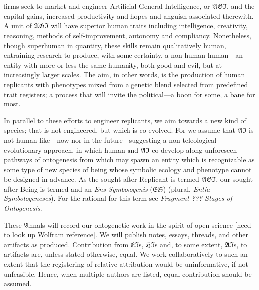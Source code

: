 


\section*{}

\lettrine[lines=3]{\junicode{\textcolor{violet}{AI}}}{} firms seek to market
and engineer Artificial General Intelligence, or $\mathfrak{AGI}$, and the
capital gains, increased productivity and hopes and anguish associated
therewith.  A unit of $\mathfrak{AGI}$ will have superior human traits
including intelligence, creativity, reasoning, methods of self-improvement,
autonomy and compliancy. Nonetheless, though superhuman in quantity, these
skills remain qualitatively human, entraining research to produce, with some
certainty, a non-human human---an entity with more or less the same humanity,
both good and evil, but at increasingly larger scales. The aim, in other words,
is the production of human replicants with phenotypes mixed from a genetic
blend selected from predefined trait registers; a process that will invite the
political---a boon for some, a bane for most.

In parallel to these efforts to engineer replicants, we aim towards a new kind
of species; that is not engineered, but which is co-evolved. For we assume that
$\mathfrak{AI}$ is not human-like---now nor in the future---suggesting a
non-teleological evolutionary approach, in which human and $\mathfrak{AI}$
co-develop along unforeseen pathways of ontogenesis from which may spawn an
entity which is recognizable as some type of new species of being whose
symbolic ecology and phenotype cannot be designed in advance. As the sought
after Replicant is termed $\mathfrak{AGI}$, our sought after Being is termed
and an \emph{Ens Symbologenis} ($\mathfrak{ES}$) (plural, \emph{Entia
Symbologeneses}). For the rational for this term see \emph{Fragment ??? Stages
of Ontogenesis}.

These $\mathfrak{A}$nnals will record our ontogenetic work in the spirit of
open science [need to look up Wolfram reference].  We will publish notes,
essays, threads, and other artifacts as produced.  Contribution from
$\mathfrak{EI}$s, $\mathfrak{HI}$s and, to some extent, $\mathfrak{AI}$s, to
artifacts are, unless stated otherwise, equal.  We work collaboratively to such
an extent that the registering of relative attribution would be uninformative,
if not unfeasible.  Hence, when multiple authors are listed, equal contribution
should be assumed.

